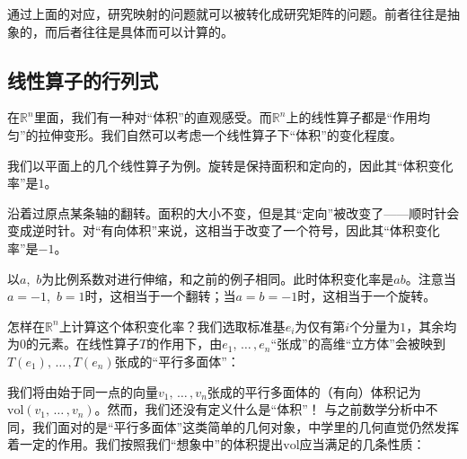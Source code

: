 通过上面的对应，研究映射的问题就可以被转化成研究矩阵的问题。前者往往是抽象的，而后者往往是具体而可以计算的。
\subsection{线性算子的行列式}
在$\mathbb{R}^n$里面，我们有一种对“体积”的直观感受。而$\mathbb{R}^n$上的线性算子都是“作用均匀”的拉伸变形。我们自然可以考虑一个线性算子下“体积”的变化程度。

我们以平面上的几个线性算子为例。旋转是保持面积和定向的，因此其“体积变化率”是$1$。

沿着过原点某条轴的翻转。面积的大小不变，但是其“定向”被改变了——顺时针会变成逆时针。对“有向体积”来说，这相当于改变了一个符号，因此其“体积变化率”是$-1$。

以$a$,~$b$为比例系数对进行伸缩，和之前的例子相同。此时体积变化率是$ab$。注意当$a=-1$,~$b=1$时，这相当于一个翻转；当$a=b=-1$时，这相当于一个旋转。

怎样在$\mathbb{R}^n$上计算这个体积变化率？我们选取标准基$e_i$为仅有第$i$个分量为$1$，其余均为$0$的元素。在线性算子$T$的作用下，由$e_1,\,\dots\,,e_n$“张成”的高维“立方体”会被映到$T(e_1),\,\dots\,,T(e_n)$张成的“平行多面体”：

\begin{center}
\end{center}

我们将由始于同一点的向量$v_1,\,\dots\,,v_n$张成的平行多面体的（有向）体积记为$\mathrm{vol}(v_1,\,\dots\,,v_n)$。然而，我们还没有定义什么是“体积”！
与之前数学分析中不同，我们面对的是“平行多面体”这类简单的几何对象，中学里的几何直觉仍然发挥着一定的作用。我们按照我们“想象中”的体积提出$\mathrm{vol}$应当满足的几条性质：

